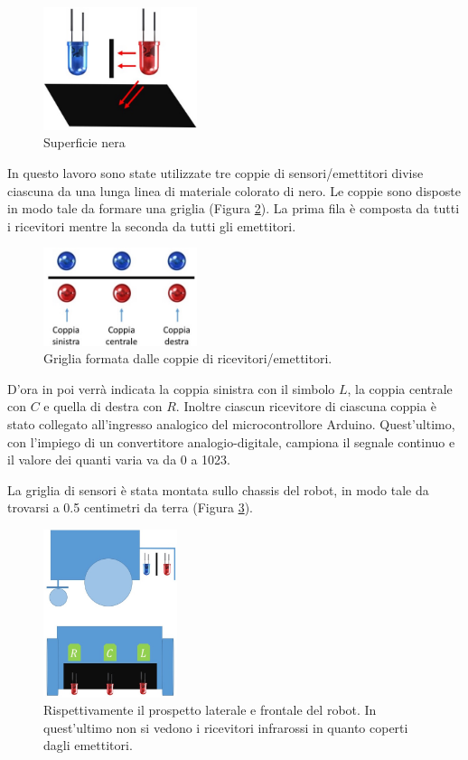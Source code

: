 \documentclass[twoside,twocolumn]{article}
\begin{document}
\begin{figure}[h]
	\centering
	\includegraphics[width=0.4\textwidth]{immagini/leds_absorb2}
	\caption{Superficie nera}
	\label{fig:leds_absorb2}
\end{figure}

In questo lavoro sono state utilizzate tre coppie di sensori/emettitori divise ciascuna da una lunga linea di materiale colorato di nero. Le coppie sono disposte in modo tale da formare una griglia (Figura \ref{fig:configurazione}). La prima fila è composta da tutti i ricevitori mentre la seconda da tutti gli emettitori. 

\begin{figure}[h]
	\centering
	\includegraphics[width=0.4\textwidth]{immagini/configurazione}
	\caption{Griglia formata dalle coppie di ricevitori/emettitori.}
	\label{fig:configurazione}
\end{figure}

D'ora in poi verrà indicata la coppia sinistra con il simbolo $L$, la coppia centrale con $C$ e quella di destra con $R$.
Inoltre ciascun ricevitore di ciascuna coppia è stato collegato all'ingresso analogico del microcontrollore Arduino. Quest'ultimo, con l'impiego di un convertitore analogio-digitale, campiona il segnale continuo e il valore dei quanti varia va da 0 a 1023.

La griglia di sensori è stata montata sullo chassis del robot, in modo tale da trovarsi a 0.5 centimetri da terra (Figura \ref{fig:robot_stilizzato}).   

\begin{figure}[h]
	\centering
	\includegraphics[width=0.35\textwidth]{immagini/robot_stilizzato}
	\caption{Rispettivamente il prospetto laterale e frontale del robot. In quest'ultimo non si vedono i ricevitori infrarossi in quanto coperti dagli emettitori.}
	\label{fig:robot_stilizzato}
\end{figure}
\end{document}
